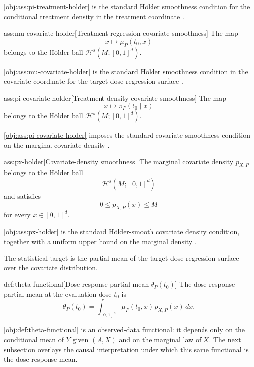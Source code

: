 \cref{obj:ass:pi-treatment-holder} is the standard Hölder smoothness condition for the conditional treatment density in the treatment coordinate \citep{bonvini2022}.

\begin{assumptionv}{ass:mu-covariate-holder}[Treatment-regression covariate smoothness]
The map
\[
x\longmapsto \mu_P(t_0,x)
\]
belongs to the Hölder ball \(\mathcal H^s(M;[0,1]^d)\).
\end{assumptionv}

\cref{obj:ass:mu-covariate-holder} is the standard Hölder smoothness condition in the covariate coordinate for the target-dose regression surface \citep{tsybakov2009}.

\begin{assumptionv}{ass:pi-covariate-holder}[Treatment-density covariate smoothness]
The map
\[
x\longmapsto \pi_P(t_0\mid x)
\]
belongs to the Hölder ball \(\mathcal H^s(M;[0,1]^d)\).
\end{assumptionv}

\cref{obj:ass:pi-covariate-holder} imposes the standard covariate smoothness condition on the marginal covariate density \citep{bonvini2022}.

\begin{assumptionv}{ass:px-holder}[Covariate-density smoothness]
The marginal covariate density \(p_{X,P}\) belongs to the Hölder ball
\[
\mathcal H^s(M;[0,1]^d)
\]
and satisfies
\[
0 \le p_{X,P}(x) \le M
\]
for every \(x\in[0,1]^d\).
\end{assumptionv}

\cref{obj:ass:px-holder} is the standard Hölder-smooth covariate density condition, together with a uniform upper bound on the marginal density \citep{bonvini2022}.

The statistical target is the partial mean of the target-dose regression surface over the covariate distribution.

\begin{definitionv}{def:theta-functional}[Dose-response partial mean $\theta_P(t_0)$]
The dose-response partial mean at the evaluation dose $t_0$ is
\[
\theta_P(t_0)
=
\int_{[0,1]^d} \mu_P(t_0,x)\,p_{X,P}(x)\,dx .
\]
\end{definitionv}

\cref{obj:def:theta-functional} is an observed-data functional: it depends only on the conditional mean of \(Y\) given \((A,X)\) and on the marginal law of \(X\). The next subsection overlays the causal interpretation under which this same functional is the dose-response mean.


